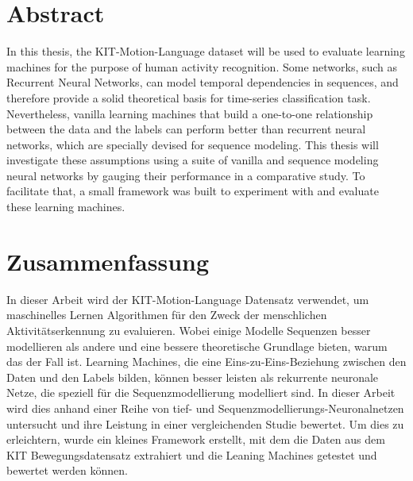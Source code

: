 \section*{Abstract}
	In this thesis, the KIT-Motion-Language dataset\cite{Plappert2016} will be used to evaluate learning machines for the purpose of human activity recognition. Some networks, such as Recurrent Neural Networks, can model temporal dependencies in sequences, and therefore provide a solid theoretical basis for time-series classification task. Nevertheless, vanilla learning machines that build a one-to-one relationship between the data and the labels can perform better than recurrent neural networks, which are specially devised for sequence modeling. This thesis will investigate these assumptions using a suite of vanilla and sequence modeling neural networks by gauging their performance in a comparative study. To facilitate that, a small framework was built to experiment with and evaluate these learning machines.
\section*{Zusammenfassung}
	In dieser Arbeit wird der KIT-Motion-Language Datensatz\cite{Plappert2016} verwendet, um maschinelles Lernen Algorithmen für den Zweck der menschlichen Aktivitätserkennung zu evaluieren. Wobei einige Modelle Sequenzen besser modellieren als andere und eine bessere theoretische Grundlage bieten, warum das der Fall ist. Learning Machines, die eine Eins-zu-Eins-Beziehung zwischen den Daten und den Labels bilden, können besser leisten als rekurrente neuronale Netze, die speziell für die Sequenzmodellierung modelliert sind. In dieser Arbeit wird dies anhand einer Reihe von tief- und \newline Sequenzmodellierungs-Neuronalnetzen untersucht und ihre Leistung in einer vergleichenden Studie bewertet. Um dies zu erleichtern, wurde ein kleines Framework erstellt, mit dem die Daten aus dem KIT Bewegungsdatensatz extrahiert und die Leaning Machines getestet und bewertet werden können. 
